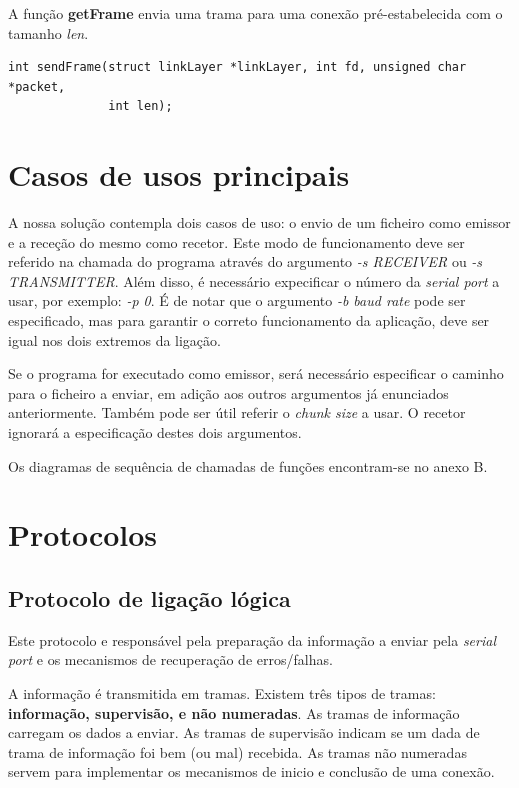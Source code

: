 \documentclass[11pt]{report}
\begin{document}
A função \textbf{getFrame} envia uma trama para uma conexão pré-estabelecida com o tamanho
\textit{len}.
\begin{lstlisting}
int sendFrame(struct linkLayer *linkLayer, int fd, unsigned char *packet,
              int len);
\end{lstlisting}

{\let\clearpage\relax \chapter{Casos de usos principais}}

A nossa solução contempla dois casos de uso: o envio de um ficheiro como emissor
e a receção do mesmo como recetor. Este modo de funcionamento deve ser referido
na chamada do programa através do argumento \textit{-s RECEIVER} ou
\textit{-s TRANSMITTER}. Além disso, é necessário expecificar o número da
\textit{serial port} a usar, por exemplo: \textit{-p 0}. É de notar que o
argumento \textit{-b baud rate} pode ser especificado, mas para garantir o
correto funcionamento da aplicação, deve ser igual nos dois extremos da ligação.

Se o programa for executado como emissor, será necessário especificar o caminho
para o ficheiro a enviar, em adição aos outros argumentos já enunciados
anteriormente. Também pode ser útil referir o \textit{chunk size} a usar. O
recetor ignorará a especificação destes dois argumentos.

Os diagramas de sequência de chamadas de funções encontram-se no anexo B.

{\let\clearpage\relax \chapter{Protocolos}}

\section{Protocolo de ligação lógica}

Este protocolo e responsável pela preparação da informação a enviar pela
\textit{serial port} e os mecanismos de recuperação de erros/falhas.

A informação é transmitida em tramas. Existem três tipos de tramas:
\textbf{informação, supervisão, e não numeradas}. As tramas de informação
carregam os dados a enviar. As tramas de supervisão indicam se um dada de
trama de informação foi bem (ou mal) recebida. As tramas não numeradas servem
para implementar os mecanismos de inicio e conclusão de uma conexão.
\end{document}
